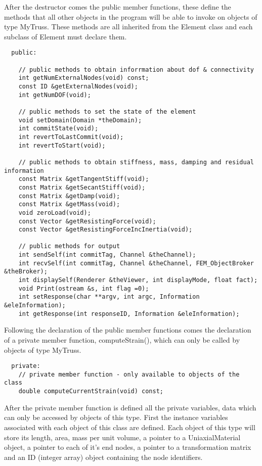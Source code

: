 \documentclass[12pt]{article}
\begin{document}
After the destructor comes the public member functions, these define
the methods that all other objects in the program will be able to
invoke on objects of type MyTruss. These methods are all inherited
from the Element class and each subclass of Element must declare them.

{\sf\small \begin{verbatim}
  public:

    // public methods to obtain inforrmation about dof & connectivity
    int getNumExternalNodes(void) const;
    const ID &getExternalNodes(void);
    int getNumDOF(void);

    // public methods to set the state of the element
    void setDomain(Domain *theDomain);
    int commitState(void);
    int revertToLastCommit(void);        
    int revertToStart(void);        

    // public methods to obtain stiffness, mass, damping and residual information
    const Matrix &getTangentStiff(void);
    const Matrix &getSecantStiff(void);    
    const Matrix &getDamp(void);    
    const Matrix &getMass(void);    
    void zeroLoad(void);	
    const Vector &getResistingForce(void);
    const Vector &getResistingForceIncInertia(void);            

    // public methods for output
    int sendSelf(int commitTag, Channel &theChannel);
    int recvSelf(int commitTag, Channel &theChannel, FEM_ObjectBroker &theBroker);
    int displaySelf(Renderer &theViewer, int displayMode, float fact);    
    void Print(ostream &s, int flag =0);    
    int setResponse(char **argv, int argc, Information &eleInformation);
    int getResponse(int responseID, Information &eleInformation);

\end{verbatim} }

Following the declaration of the public member functions comes the
declaration of a private member function, {\sf computeStrain()}, which
can only be called by objects of type MyTruss.

{\sf\small \begin{verbatim}    
  private:
    // private member function - only available to objects of the class
    double computeCurrentStrain(void) const;
\end{verbatim} }

After the private member function is defined all the private
variables, data which can only be accessed by objects of this
type. First the instance variables associated with each object of this
class are defined. Each object of this type will store its length,
area, mass per unit volume, a pointer to a UniaxialMaterial object, 
a pointer to each of it's end nodes, a pointer to a transformation matrix and an ID
(integer array) object containing the node identifiers. 
\end{document}
